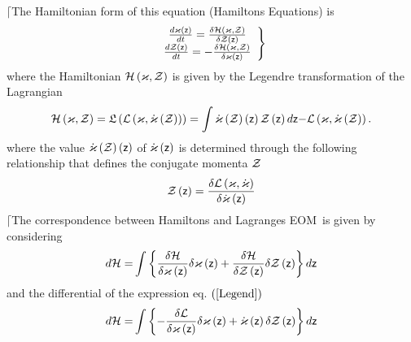 $\lceil $The Hamiltonian form of this equation (Hamiltons Equations) is 
\begin{equation}
\left. 
\begin{array}{c}
\frac{d{\cal \varkappa }\left( {\sf z}\right) }{dt}=\frac{\delta {\cal H}%
\left( {\cal \varkappa },{\cal Z}\right) }{\delta {\cal Z}\left( {\sf z}%
\right) } \\ 
\frac{d{\cal Z}\left( {\sf z}\right) }{dt}=-\frac{\delta {\cal H}\left( 
{\cal \varkappa },{\cal Z}\right) }{\delta {\cal \varkappa }\left( {\sf z}%
\right) }%
\end{array}%
\right\}  \label{HE}
\end{equation}%
where the Hamiltonian ${\cal H}\left( {\cal \varkappa },{\cal Z}\right) $ is
given by the Legendre transformation of the Lagrangian 
\begin{equation}
{\cal H}\left( {\cal \varkappa },{\cal Z}\right) ={\frak L}\left( {\cal L}%
\left( {\cal \varkappa },{\cal \dot{\varkappa}}\left( {\cal Z}\right)
\right) \right) =\int {\cal \dot{\varkappa}}\left( {\cal Z}\right) \left( 
{\sf z}\right) {\cal Z}\left( {\sf z}\right) d{\sf z-}{\cal L}\left( {\cal %
\varkappa },{\cal \dot{\varkappa}}\left( {\cal Z}\right) \right) .
\label{Legend}
\end{equation}%
where the value ${\cal \dot{\varkappa}}\left( {\cal Z}\right) \left( {\sf z}%
\right) $ of ${\cal \dot{\varkappa}}\left( {\sf z}\right) $ is determined
through the following relationship that defines the conjugate momenta ${\cal %
Z}$ 
\begin{equation}
{\cal Z\left( {\sf z}\right) }=\frac{\delta {\cal L}\left( {\cal \varkappa },%
{\cal \dot{\varkappa}}\right) }{\delta {\cal \dot{\varkappa}}\left( {\sf z}%
\right) }  \label{conjmom}
\end{equation}%
$\lceil $The correspondence between Hamiltons and Lagranges EOM\ is given by
considering 
\begin{equation}
d{\cal H=}\int \left\{ \frac{\delta {\cal H}}{\delta {\cal \varkappa }\left( 
{\sf z}\right) }\delta {\cal \varkappa }\left( {\sf z}\right) +\frac{\delta 
{\cal H}}{\delta {\cal Z}\left( {\sf z}\right) }\delta {\cal Z}\left( {\sf z}%
\right) \right\} d{\sf z}
\end{equation}%
and the differential of the expression eq. $\left( \ref{Legend}\right) $ 
\begin{equation}
d{\cal H=}\int \left\{ -\frac{\delta {\cal L}}{\delta {\cal \varkappa }%
\left( {\sf z}\right) }\delta {\cal \varkappa }\left( {\sf z}\right) +{\cal 
\dot{\varkappa}}\left( {\sf z}\right) \delta {\cal Z}\left( {\sf z}\right)
\right\} d{\sf z}
\end{equation}%
